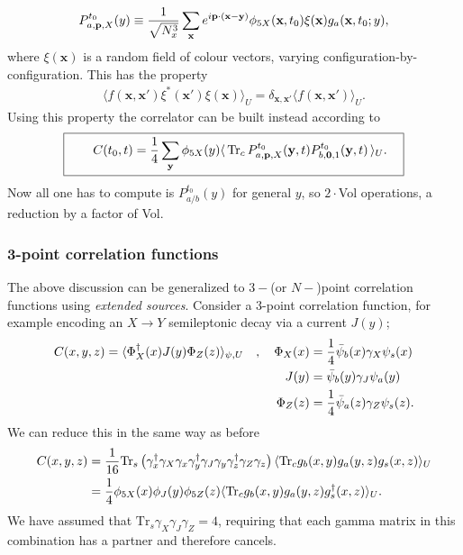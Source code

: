 \begin{align}
  P^{t_0}_{a,{\textbf{p}},X}(y) \equiv {1\over \sqrt{N_x^3}} \sum_{\textbf{x}} e^{i{\textbf{p}}\cdot ({\textbf{x}}-{\textbf{y}})} \phi_{5X}({\textbf{x}},t_0) \xi({\textbf{x}}) g_a({\textbf{x}},t_0;y),
\end{align}
where $\xi({\textbf{x}})$ is a random field of colour vectors, varying configuration-by-configuration. This has the property
\begin{align}
  \langle f({\textbf{x}},{\textbf{x}}') \xi^*({\textbf{x}}')\xi({\textbf{x}})\rangle_U = \delta_{{\textbf{x}},{\textbf{x}}'} \langle f({\textbf{x}},{\textbf{x}}') \rangle_U.
\end{align}
Using this property the correlator can be built instead according to
\begin{align}
  \boxed{\quad  \quad C(t_0,t) = {1\over 4} \sum_{\textbf{y}} \phi_{5X}(y) \langle \,\text{Tr}_c \, P^{t_0}_{a,{\textbf{p}},X}({\textbf{y}},t) P^{t_0}_{b,{\textbf{0}},1}({\textbf{y}},t) \,\rangle_U. \quad}
  \label{eq:tietogether}
\end{align}
Now all one has to compute is $P^{t_0}_{a/b}(y)$ for general $y$, so $2\cdot$Vol operations, a reduction by a factor of Vol.

\subsubsection{3-point correlation functions}

The above discussion can be generalized to $3-$(or $N-$)point correlation functions using {\it{extended sources}}. Consider a 3-point correlation function, for example encoding an $X\to Y$ semileptonic decay via a current $J(y)$;
\begin{align}
  C(x,y,z) = \langle \Phi^{\dagger}_X(x) J(y) \Phi_Z(z) \rangle_{\psi,U} \quad , \quad \Phi_X(x) &= {1\over 4} \bar{\psi}_b(x) \gamma_X \psi_s(x) \\
  \nonumber
  J(y) &= \bar{\psi}_b(y)\gamma_J\psi_a(y) \\
  \nonumber
  \Phi_Z(z) &= {1\over 4}\bar{\psi}_a(z)\gamma_Z \psi_s(z).
\end{align}
We can reduce this in the same way as before
\begin{align}
  C(x,y,z) &= {1\over 16} \text{Tr}_s\left( \gamma^{\dagger}_x \gamma_X \gamma_x \gamma^{\dagger}_y \gamma_J \gamma_y \gamma^{\dagger}_z \gamma_Z \gamma_z \right) \langle \text{Tr}_c g_{b}(x,y) g_{a}(y,z) g_{s}(x,z)\rangle_U \\
  &= {1\over 4} \phi_{5X}(x) \phi_J(y) \phi_{5Z}(z) \langle \text{Tr}_c g_{b}(x,y) g_{a}(y,z) g^{\dagger}_{s}(x,z) \rangle_U.
\end{align}
We have assumed that $\text{Tr}_s \gamma_X\gamma_J\gamma_Z = 4$, requiring that each gamma matrix in this combination has a partner and therefore cancels.

